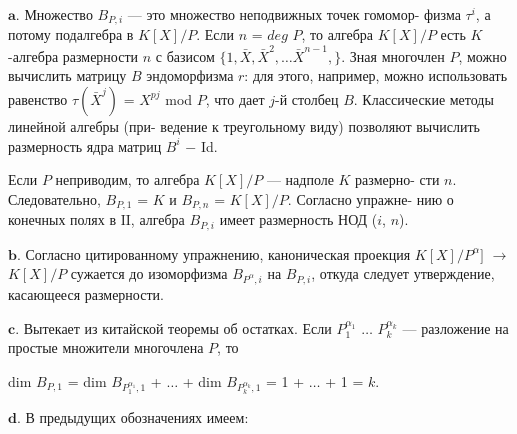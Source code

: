 $\mathbf{a.}$ Множество $B_{P,i}$ --- это множество неподвижных точек гомомор­- \linebreak
физма $\tau^{i}$, а потому подалгебра в $K[X]/P$.  Если $n$ = $deg$ $P$, то алгебра \linebreak
$K[X]/P$ есть $K$-алгебра размерности $n$ с базисом $\{1, \bar X, \bar X^{2}, \dots\bar X^{n-1},\}$. \linebreak
Зная многочлен $P$,  можно вычислить матрицу $B$ эндоморфизма $r$: для \linebreak
этого, например, можно использовать равенство $\tau(\bar X^{j})$ = $X^{pj}$ mod $P$,\linebreak
что дает  $j$-й столбец $B$.  Классические методы линейной алгебры (при­- \linebreak
ведение к треугольному виду) позволяют вычислить размерность ядра \linebreak
матриц $B^{i}$ $-$ Id.

\newpage


Если $P$ неприводим, то алгебра $K[X]/P$ --- надполе $K$ размерно­- \linebreak
сти $n$. Следовательно, $B_{P, 1}$ = $K$ и $B_{P, n}$ = $K[X]/P$.  Согласно упражне­- \linebreak
нию о конечных полях в I$\hspace{0pt}$I, алгебра $B_{P, i}$ имеет размерность НОД ($i$, $n$). \ 

\vspace{3pt}$\mathbf{b.}$ Согласно цитированному упражнению, каноническая проекция \linebreak
$K[X]/P^{\alpha}]$ $\rightarrow$ $K[X]/P$ сужается до изоморфизма $B_{P^{\alpha}, i}$ на $B_{P, i}$,  откуда \linebreak
следует утверждение, касающееся размерности. \ 

\vspace{3pt}$\mathbf{c.}$ Вытекает из китайской теоремы об остатках. Если ${P^{\alpha_{1}}_{1}}$ $\dots$ ${P^{\alpha_{k}}_{k}}$ \linebreak
--- разложение на простые множители многочлена $P$, то

\begin{center}
dim $B_{P, 1}$ = dim $B_{P^{\alpha_{1}}_{1}, 1}$ + $\dots$ +  dim $B_{P^{\alpha_{k}}_{k}, 1}$ = 1 + $\dots$ + 1 = $k$.
\end{center}

$\mathbf{d.}$ В предыдущих обозначениях имеем: \newline

